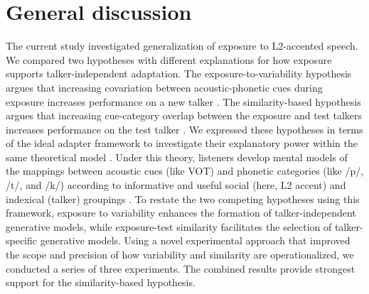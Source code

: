 \documentclass[preprint, 3p, authoryear]{elsarticle} %
\begin{document}
\hypertarget{discuss-study1}{%
\section{General discussion}\label{discuss-study1}}

The current study investigated generalization of exposure to L2-accented speech.
We compared two hypotheses with different explanations for how exposure supports talker-independent adaptation.
The exposure-to-variability hypothesis argues that increasing covariation between acoustic-phonetic cues during exposure increases performance on a new talker \citep{baese2013, bradlow2008}.
The similarity-based hypothesis argues that increasing cue-category overlap between the exposure and test talkers increases performance on the test talker \citep{xie2017similarity}.
We expressed these hypotheses in terms of the ideal adapter framework to investigate their explanatory power within the same theoretical model \citep{kleinschmidt2015}.
Under this theory, listeners develop mental models of the mappings between acoustic cues (like VOT) and phonetic categories (like /p/, /t/, and /k/) according to informative and useful social (here, L2 accent) and indexical (talker) groupings \citep{kleinschmidt2019}.
To restate the two competing hypotheses using this framework, exposure to variability enhances the formation of talker-independent generative models, while exposure-test similarity facilitates the selection of talker-specific generative models.
Using a novel experimental approach that improved the scope and precision of how variability and similarity are operationalized, we conducted a series of three experiments.
The combined results provide strongest support for the similarity-based hypothesis.
\end{document}
